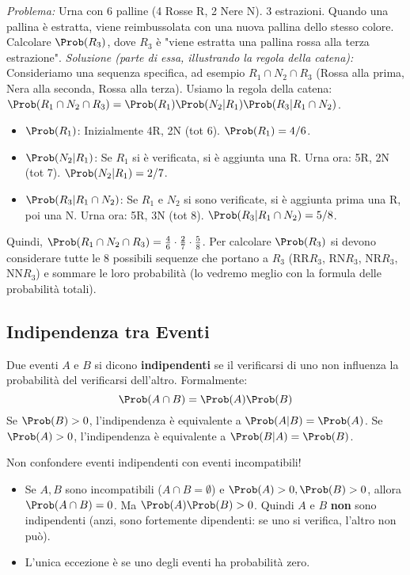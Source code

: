 \begin{example}
\textit{Problema:} Urna con 6 palline (4 Rosse R, 2 Nere N). 3 estrazioni. Quando una pallina è estratta, viene reimbussolata con una nuova pallina dello stesso colore. Calcolare $\Prob(R_3)$, dove $R_3$ è "viene estratta una pallina rossa alla terza estrazione".
\textit{Soluzione (parte di essa, illustrando la regola della catena):}
Consideriamo una sequenza specifica, ad esempio $R_1 \cap N_2 \cap R_3$ (Rossa alla prima, Nera alla seconda, Rossa alla terza).
Usiamo la regola della catena: $\Prob(R_1 \cap N_2 \cap R_3) = \Prob(R_1) \Prob(N_2|R_1) \Prob(R_3|R_1 \cap N_2)$.
\begin{itemize}
    \item $\Prob(R_1)$: Inizialmente 4R, 2N (tot 6). $\Prob(R_1) = 4/6$.
    \item $\Prob(N_2|R_1)$: Se $R_1$ si è verificata, si è aggiunta una R. Urna ora: 5R, 2N (tot 7). $\Prob(N_2|R_1) = 2/7$.
    \item $\Prob(R_3|R_1 \cap N_2)$: Se $R_1$ e $N_2$ si sono verificate, si è aggiunta prima una R, poi una N. Urna ora: 5R, 3N (tot 8). $\Prob(R_3|R_1 \cap N_2) = 5/8$.
\end{itemize}
Quindi, $\Prob(R_1 \cap N_2 \cap R_3) = \frac{4}{6} \cdot \frac{2}{7} \cdot \frac{5}{8}$.
Per calcolare $\Prob(R_3)$ si devono considerare tutte le 8 possibili sequenze che portano a $R_3$ (RR$R_3$, RN$R_3$, NR$R_3$, NN$R_3$) e sommare le loro probabilità (lo vedremo meglio con la formula delle probabilità totali).
\end{example}

\subsection{Indipendenza tra Eventi}
\begin{definition}
Due eventi $A$ e $B$ si dicono \textbf{indipendenti} se il verificarsi di uno non influenza la probabilità del verificarsi dell'altro. Formalmente:
\[ \Prob(A \cap B) = \Prob(A) \Prob(B) \]
Se $\Prob(B)>0$, l'indipendenza è equivalente a $\Prob(A|B) = \Prob(A)$.
Se $\Prob(A)>0$, l'indipendenza è equivalente a $\Prob(B|A) = \Prob(B)$.
\end{definition}

\begin{remark}
Non confondere eventi indipendenti con eventi incompatibili!
\begin{itemize}
    \item Se $A, B$ sono incompatibili ($A \cap B = \emptyset$) e $\Prob(A)>0, \Prob(B)>0$, allora $\Prob(A \cap B) = 0$. Ma $\Prob(A)\Prob(B) > 0$. Quindi $A$ e $B$ \textbf{non} sono indipendenti (anzi, sono fortemente dipendenti: se uno si verifica, l'altro non può).
    \item L'unica eccezione è se uno degli eventi ha probabilità zero.
\end{itemize}
\end{remark}

